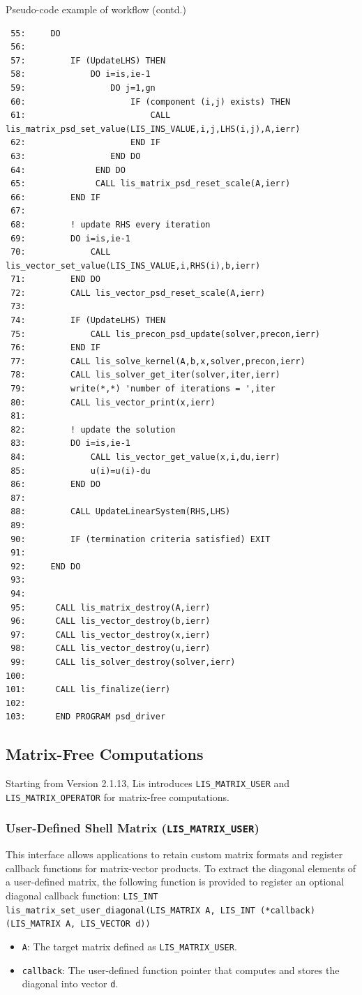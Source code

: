 \documentclass[a4paper]{article}
\begin{document}
\begin{itembox}[l]{Pseudo-code example of workflow (contd.)}
{\small
\begin{verbatim}
 55:     DO
 56:
 57:         IF (UpdateLHS) THEN
 58:             DO i=is,ie-1
 59:                 DO j=1,gn
 60:                     IF (component (i,j) exists) THEN
 61:                         CALL lis_matrix_psd_set_value(LIS_INS_VALUE,i,j,LHS(i,j),A,ierr)
 62:                     END IF
 63:                 END DO
 64:              END DO
 65:              CALL lis_matrix_psd_reset_scale(A,ierr)
 66:         END IF
 67:
 68:         ! update RHS every iteration
 69:         DO i=is,ie-1
 70:             CALL lis_vector_set_value(LIS_INS_VALUE,i,RHS(i),b,ierr)
 71:         END DO
 72:         CALL lis_vector_psd_reset_scale(A,ierr)
 73:
 74:         IF (UpdateLHS) THEN
 75:             CALL lis_precon_psd_update(solver,precon,ierr)
 76:         END IF
 77:         CALL lis_solve_kernel(A,b,x,solver,precon,ierr)
 78:         CALL lis_solver_get_iter(solver,iter,ierr)
 79:         write(*,*) 'number of iterations = ',iter
 80:         CALL lis_vector_print(x,ierr)
 81:
 82:         ! update the solution
 83:         DO i=is,ie-1
 84:             CALL lis_vector_get_value(x,i,du,ierr)
 85:             u(i)=u(i)-du
 86:         END DO
 87:
 88:         CALL UpdateLinearSystem(RHS,LHS)
 89:
 90:         IF (termination criteria satisfied) EXIT
 91:
 92:     END DO
 93:
 94:
 95:      CALL lis_matrix_destroy(A,ierr)
 96:      CALL lis_vector_destroy(b,ierr)
 97:      CALL lis_vector_destroy(x,ierr)
 98:      CALL lis_vector_destroy(u,ierr)
 99:      CALL lis_solver_destroy(solver,ierr)
100:
101:      CALL lis_finalize(ierr)
102:
103:      END PROGRAM psd_driver
\end{verbatim}
}
\end{itembox}

\newpage
\subsection{Matrix-Free Computations}
Starting from Version 2.1.13, Lis introduces \texttt{LIS\_MATRIX\_USER} and \texttt{LIS\_MATRIX\_OPERATOR} for matrix-free computations.
\subsubsection{User-Defined Shell Matrix (\texttt{LIS\_MATRIX\_USER})}
This interface allows applications to retain custom matrix formats and register callback functions for matrix-vector products. To extract the diagonal elements of a user-defined matrix, the following function is provided to register an optional diagonal callback function:
\noindent
\texttt{LIS\_INT lis\_matrix\_set\_user\_diagonal(LIS\_MATRIX A, LIS\_INT (*callback)(LIS\_MATRIX A, LIS\_VECTOR d))}
\begin{itemize}
\item \texttt{A}: The target matrix defined as \texttt{LIS\_MATRIX\_USER}.
\item \texttt{callback}: The user-defined function pointer that computes and stores the diagonal into vector \texttt{d}.
\end{itemize}
\end{document}
